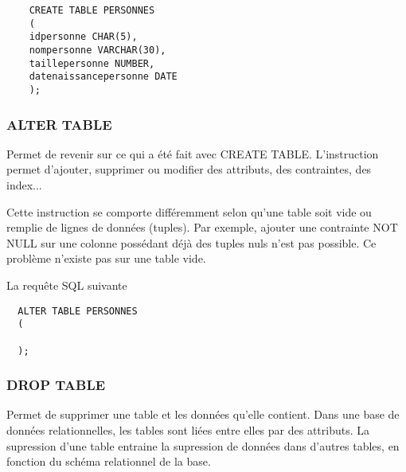   \begin{lstlisting}
    CREATE TABLE PERSONNES
    (
    idpersonne CHAR(5),
    nompersonne VARCHAR(30),
    taillepersonne NUMBER,
    datenaissancepersonne DATE
    );
  \end{lstlisting}


\subsubsection{ALTER TABLE}
Permet de revenir sur ce qui a été fait avec CREATE TABLE.
L'instruction permet d'ajouter, supprimer ou modifier des \glspl{attribut}, des contraintes, des index...

Cette instruction se comporte différemment selon qu'une table soit vide ou remplie de lignes de données (\glspl{tuple}).
Par exemple, ajouter une contrainte NOT NULL sur une colonne possédant déjà des tuples nuls n'est pas possible. Ce problème n'existe pas sur une table vide.

La requête SQL suivante

\begin{lstlisting}
  ALTER TABLE PERSONNES
  (
  
  );
\end{lstlisting}

\subsubsection{DROP TABLE}
Permet de supprimer une table et les données qu'elle contient.
Dans une base de données relationnelles, les tables sont liées entre elles par des attributs.
La supression d'une table entraine la supression de données dans d'autres tables, en fonction du schéma relationnel de la base.
